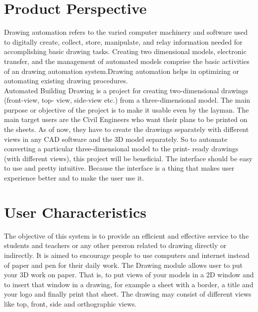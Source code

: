 \section{Product Perspective}
Drawing automation refers to the varied computer machinery and software used to digitally create, collect, store, manipulate, and relay information needed for accomplishing basic drawing tasks. Creating two dimensional models, electronic transfer, and the management of automated models comprise the basic activities of an drawing automation system.Drawing automation helps in optimizing or automating existing drawing procedures. \\

\noindent Automated Building Drawing is a project for creating two-dimensional drawings (front-view, top-
view, side-view etc.) from a three-dimensional model. The main purpose or objective of the project is to make it usable even by the layman. The main
target users are the Civil Engineers who want their plans to be printed on the sheets. As of now,
they have to create the drawings separately with different views in any CAD software and the 3D
model separately. So to automate converting a particular three-dimensional model to the print-
ready drawings (with different views), this project will be beneficial. The interface should be easy
to use and pretty intuitive. Because the interface is a thing that makes user experience better and
to make the user use it.


\section{User Characteristics}
The objective of this system is to provide an efficient and effective service to the students and teachers or any other persron related to drawing directly or indirectly. It is aimed to encourage people to use computers and internet instead of paper and pen for their daily work. The Drawing module allows user to put your 3D work on paper. That is, to put views of your
models in a 2D window and to insert that window in a drawing, for example a sheet with a border,
a title and your logo and finally print that sheet. The drawing may consist of different views like
top, front, side and orthographic views.



